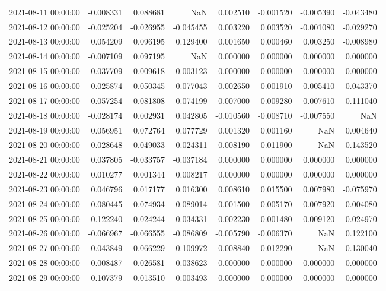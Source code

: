 \begin{tabular}{lrrrrrrr}
2021-08-11 00:00:00 & -0.008331 & 0.088681 & NaN & 0.002510 & -0.001520 & -0.005390 & -0.043480 \\
2021-08-12 00:00:00 & -0.025204 & -0.026955 & -0.045455 & 0.003220 & 0.003520 & -0.001080 & -0.029270 \\
2021-08-13 00:00:00 & 0.054209 & 0.096195 & 0.129400 & 0.001650 & 0.000460 & 0.003250 & -0.008980 \\
2021-08-14 00:00:00 & -0.007109 & 0.097195 & NaN & 0.000000 & 0.000000 & 0.000000 & 0.000000 \\
2021-08-15 00:00:00 & 0.037709 & -0.009618 & 0.003123 & 0.000000 & 0.000000 & 0.000000 & 0.000000 \\
2021-08-16 00:00:00 & -0.025874 & -0.050345 & -0.077043 & 0.002650 & -0.001910 & -0.005410 & 0.043370 \\
2021-08-17 00:00:00 & -0.057254 & -0.081808 & -0.074199 & -0.007000 & -0.009280 & 0.007610 & 0.111040 \\
2021-08-18 00:00:00 & -0.028174 & 0.002931 & 0.042805 & -0.010560 & -0.008710 & -0.007550 & NaN \\
2021-08-19 00:00:00 & 0.056951 & 0.072764 & 0.077729 & 0.001320 & 0.001160 & NaN & 0.004640 \\
2021-08-20 00:00:00 & 0.028648 & 0.049033 & 0.024311 & 0.008190 & 0.011900 & NaN & -0.143520 \\
2021-08-21 00:00:00 & 0.037805 & -0.033757 & -0.037184 & 0.000000 & 0.000000 & 0.000000 & 0.000000 \\
2021-08-22 00:00:00 & 0.010277 & 0.001344 & 0.008217 & 0.000000 & 0.000000 & 0.000000 & 0.000000 \\
2021-08-23 00:00:00 & 0.046796 & 0.017177 & 0.016300 & 0.008610 & 0.015500 & 0.007980 & -0.075970 \\
2021-08-24 00:00:00 & -0.080445 & -0.074934 & -0.089014 & 0.001500 & 0.005170 & -0.007920 & 0.004080 \\
2021-08-25 00:00:00 & 0.122240 & 0.024244 & 0.034331 & 0.002230 & 0.001480 & 0.009120 & -0.024970 \\
2021-08-26 00:00:00 & -0.066967 & -0.066555 & -0.086809 & -0.005790 & -0.006370 & NaN & 0.122100 \\
2021-08-27 00:00:00 & 0.043849 & 0.066229 & 0.109972 & 0.008840 & 0.012290 & NaN & -0.130040 \\
2021-08-28 00:00:00 & -0.008487 & -0.026581 & -0.038623 & 0.000000 & 0.000000 & 0.000000 & 0.000000 \\
2021-08-29 00:00:00 & 0.107379 & -0.013510 & -0.003493 & 0.000000 & 0.000000 & 0.000000 & 0.000000 \\

\end{tabular}

